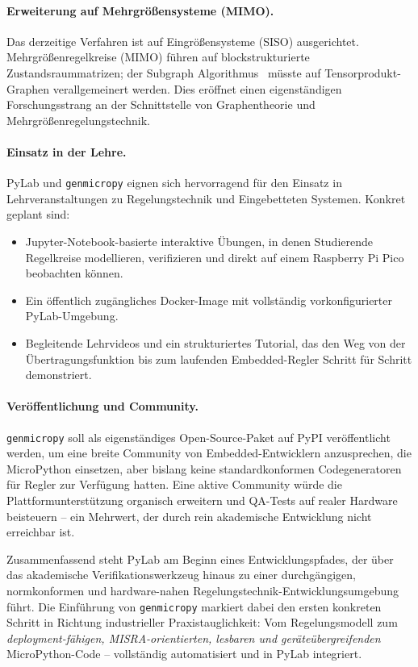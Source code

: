 \documentclass[a4paper,12pt]{article}
\theoremstyle{definition}
\begin{document}
\paragraph{Erweiterung auf Mehrgrößensysteme (MIMO).}
Das derzeitige Verfahren ist auf Eingrößensysteme (SISO) ausgerichtet.
Mehrgrößenregelkreise (MIMO) führen auf block\-strukturierte Zustandsraummatrizen;
der Subgraph Algorithmus~\cite{ullmann} müsste auf Tensor\-produkt-Graphen verallgemeinert werden.
Dies eröffnet einen eigenständigen Forschungsstrang an der Schnittstelle von
Graphentheorie und Mehrgrößenregelungstechnik.

\paragraph{Einsatz in der Lehre.}
PyLab und \texttt{genmicropy} eignen sich hervorragend für den Einsatz in
Lehrveranstaltungen zu Regelungstechnik und Eingebetteten Systemen.
Konkret geplant sind:
\begin{itemize}
    \item Jupyter-Notebook-basierte interaktive Übungen, in denen
          Studierende Regelkreise modellieren, verifizieren und direkt auf
          einem Raspberry Pi Pico beobachten können.
    \item Ein öffentlich zugängliches Docker-Image mit vollständig
          vorkonfigurierter PyLab-Umgebung.
    \item Begleitende Lehrvideos und ein strukturiertes Tutorial, das den
          Weg von der Übertragungsfunktion bis zum laufenden Embedded-Regler
          Schritt für Schritt demonstriert.
\end{itemize}

\paragraph{Veröffentlichung und Community.}
\texttt{genmicropy} soll als eigenständiges Open-Source-Paket auf PyPI
veröffentlicht werden, um eine breite Community von Embedded-Entwicklern
anzusprechen, die MicroPython einsetzen, aber bislang keine
standard\-konformen Code\-generatoren für Regler zur Verfügung hatten. Eine
aktive Community würde die Plattform\-unter\-stützung organisch erweitern und
QA-Tests auf realer Hardware beisteuern -- ein Mehrwert, der durch rein
akademische Entwicklung nicht erreichbar ist.

\bigskip
Zusammenfassend steht PyLab am Beginn eines Entwicklungspfades, der
über das akademische Verifikations\-werkzeug hinaus zu einer durchgängigen,
norm\-konformen und hardware-nahen Regelungstechnik-Entwicklungsumgebung
führt. Die Einführung von \texttt{genmicropy} markiert dabei den ersten
konkreten Schritt in Richtung industrieller Praxistauglichkeit: Vom
Regelungsmodell zum \emph{deployment-fähigen, MISRA-orientierten,
lesbaren und geräteübergreifenden} MicroPython-Code -- vollständig
automatisiert und in PyLab integriert.
\end{document}
